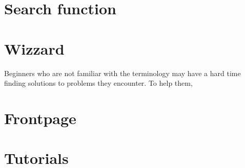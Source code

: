 \section{Search function}
\section{Wizzard}

Beginners who are not familiar with the terminology may have a hard time finding solutions to problems they encounter. To help them, 

\section{Frontpage}
\section{Tutorials}